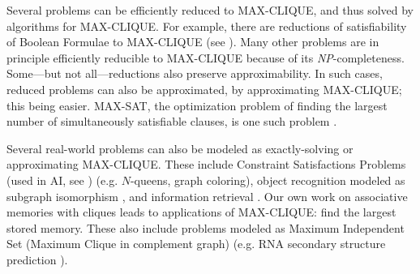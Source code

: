 \par
Several problems can be efficiently reduced to MAX-CLIQUE,
and thus solved by algorithms for MAX-CLIQUE.
For example, there are reductions of
satisfiability of Boolean Formulae to MAX-CLIQUE
(see \cite{kn:GaJ79,kn:CFS91}). 
Many other problems are in principle efficiently
reducible to MAX-CLIQUE because of its {\em NP}-completeness. 
Some---but not all---reductions also preserve approximability.
In such cases, reduced problems can also be approximated,
by approximating MAX-CLIQUE; this being easier. 
MAX-SAT, the optimization problem of finding the largest number of 
simultaneously satisfiable clauses, is one such problem
\cite{kn:CFS91}. \par
Several real-world problems can also be modeled as exactly-solving or 
approximating MAX-CLIQUE. These include Constraint 
Satisfactions Problems \cite{kn:Jag91} 
(used 
in AI, see \cite{kn:Mac87}) (e.g. $N$-queens, graph coloring), object 
recognition modeled as subgraph isomorphism \cite{kn:BaY86}, and 
information retrieval \cite{kn:AuM70}. Our own
work on associative memories with cliques \cite{kn:tr9002,kn:wordrec}
leads to applications of MAX-CLIQUE: find the largest stored memory. 
These also include problems 
modeled as Maximum Independent Set (Maximum Clique in complement graph)
(e.g. RNA secondary structure prediction \cite{kn:TCLH90}).
